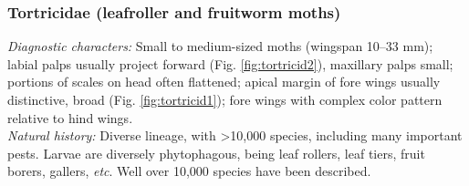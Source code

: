 \documentclass[letterpaper, 11pt]{article}
\begin{document}
\subsubsection{Tortricidae (leafroller and fruitworm moths)}
\noindent{}\textit{Diagnostic characters:} Small to medium-sized moths (wingspan 10--33 mm); labial palps usually project forward (Fig. \ref{fig:tortricid2}), maxillary palps small; portions of scales on head often flattened; apical margin of fore wings usually distinctive, broad (Fig. \ref{fig:tortricid1}); fore wings with complex color pattern relative to hind wings.\\

\noindent{}\textit{Natural history:} Diverse lineage, with \textgreater10,000 species, including many important pests. Larvae are diversely phytophagous, being leaf rollers, leaf tiers, fruit borers, gallers, \textit{etc}. Well over 10,000 species have been described.
\end{document}
